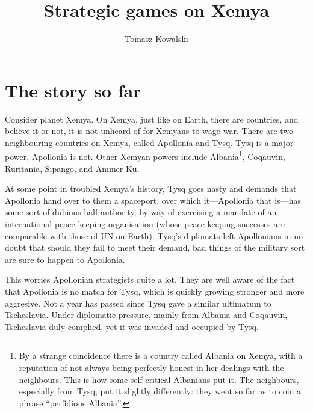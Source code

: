 \documentclass{amsart}
\title{Strategic games on Xemya}
\author{Tomasz Kowalski}
\begin{document}
\maketitle

\section{The story so far}

Consider planet Xemya. On Xemya, just like on Earth,
there are countries, and believe it or not, it is not unheard of for 
Xemyans to wage war. There are two neighbouring
countries on Xemya, called Apollonia and Tysq. Tysq is a
  major power, Apollonia is not.
  Other Xemyan powers include Albania\footnote{By a strange coincidence there is
    a country called Albania on 
  Xemya, with a reputation of not always being perfectly honest in her
  dealings with the neighbours. This is how some self-critical Albanians put it.
The neighbours, especially from Tysq, put it slightly differently: they went so
far as to coin a phrase ``perfidious Albania''.}, Coqauvin, Ruritania, Sipango,
and Ammer-Ku. 

At some point in troubled Xemya's history, Tysq goes nasty and demands that
Apollonia hand over to them a spaceport, over which it---Apollonia that is---has
some sort of dubious half-authority, by way of exercising a mandate of an international
peace-keeping organisation (whose peace-keeping successes are comparable with
those of UN on Earth). Tysq's diplomats left
Apollonians in no doubt that should they fail to meet their demand, bad things
of the military sort are sure to happen to Apollonia. 

This worries Apollonian strategists quite a lot. They are well aware
of the fact that Apollonia is no match for Tysq, which is quickly growing
stronger and more aggresive. Not 
a year has passed since Tysq gave a similar ultimatum to Tscheslavia.
Under diplomatic pressure, mainly from Albania and Coqauvin,
Tscheslavia duly complied, yet it was invaded and
occupied by Tysq. 
  
\end{document}

